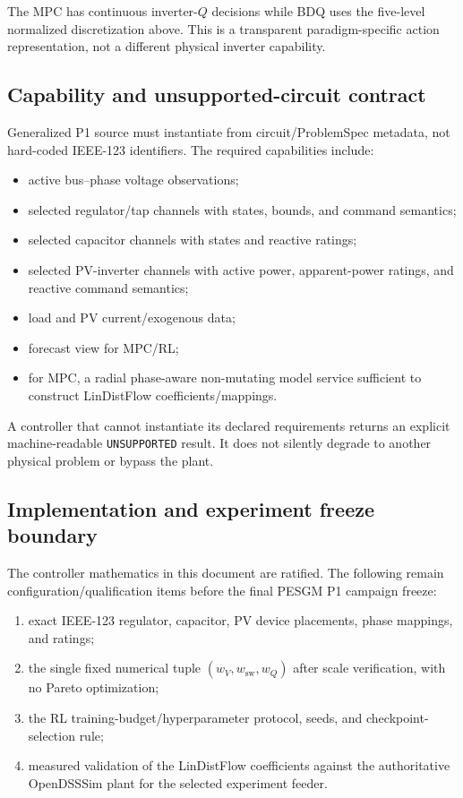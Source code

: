 The MPC has continuous inverter-$Q$ decisions while BDQ uses the five-level normalized
discretization above.  This is a transparent paradigm-specific action representation, not
a different physical inverter capability.

\subsection{Capability and unsupported-circuit contract}
\label{subsec:p1_capability}

Generalized P1 source must instantiate from circuit/ProblemSpec metadata, not hard-coded
IEEE-123 identifiers.  The required capabilities include:
\begin{itemize}
    \item active bus--phase voltage observations;
    \item selected regulator/tap channels with states, bounds, and command semantics;
    \item selected capacitor channels with states and reactive ratings;
    \item selected PV-inverter channels with active power, apparent-power ratings, and
          reactive command semantics;
    \item load and PV current/exogenous data;
    \item forecast view for MPC/RL;
    \item for MPC, a radial phase-aware non-mutating model service sufficient to construct
          LinDistFlow coefficients/mappings.
\end{itemize}
A controller that cannot instantiate its declared requirements returns an explicit
machine-readable \texttt{UNSUPPORTED} result.  It does not silently degrade to another
physical problem or bypass the plant.

\subsection{Implementation and experiment freeze boundary}
\label{subsec:p1_remaining}

The controller mathematics in this document are ratified.  The following remain
configuration/qualification items before the final PESGM P1 campaign freeze:
\begin{enumerate}
    \item exact IEEE-123 regulator, capacitor, PV device placements, phase mappings, and
          ratings;
    \item the single fixed numerical tuple $(w_V,w_{\mathrm{sw}},w_Q)$ after scale
          verification, with no Pareto optimization;
    \item the RL training-budget/hyperparameter protocol, seeds, and checkpoint-selection
          rule;
    \item measured validation of the LinDistFlow coefficients against the authoritative
          OpenDSSSim plant for the selected experiment feeder.
\end{enumerate}
